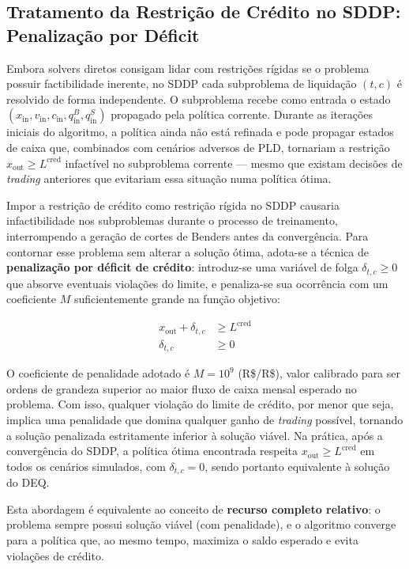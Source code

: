 \documentclass[12pt, a4paper]{article}
\begin{document}
\subsection{Tratamento da Restrição de Crédito no SDDP: Penalização por Déficit}
\label{sec:recurso_completo}

Embora solvers diretos consigam lidar com restrições rígidas se o problema possuir factibilidade inerente, no SDDP cada subproblema de liquidação $(t, c)$ é resolvido de forma independente. O subproblema recebe como entrada o estado $(x_{\text{in}}, v_{\text{in}}, c_{\text{in}}, q^B_{\text{in}}, q^S_{\text{in}})$ propagado pela política corrente. Durante as iterações iniciais do algoritmo, a política ainda não está refinada e pode propagar estados de caixa que, combinados com cenários adversos de PLD, tornariam a restrição $x_{\text{out}} \ge L^{\text{cred}}$ infactível no subproblema corrente — mesmo que existam decisões de \textit{trading} anteriores que evitariam essa situação numa política ótima.

Impor a restrição de crédito como restrição rígida no SDDP causaria infactibilidade nos subproblemas durante o processo de treinamento, interrompendo a geração de cortes de Benders antes da convergência. Para contornar esse problema sem alterar a solução ótima, adota-se a técnica de \textbf{penalização por déficit de crédito}: introduz-se uma variável de folga $\delta_{t,c} \ge 0$ que absorve eventuais violações do limite, e penaliza-se sua ocorrência com um coeficiente $M$ suficientemente grande na função objetivo:

\begin{align}
    x_{\text{out}} + \delta_{t,c} &\ge L^{\text{cred}} \label{eq:credito_soft} \\
    \delta_{t,c} &\ge 0
\end{align}

O coeficiente de penalidade adotado é $M = 10^9$ (R\$/R\$), valor calibrado para ser ordens de grandeza superior ao maior fluxo de caixa mensal esperado no problema. Com isso, qualquer violação do limite de crédito, por menor que seja, implica uma penalidade que domina qualquer ganho de \textit{trading} possível, tornando a solução penalizada estritamente inferior à solução viável. Na prática, após a convergência do SDDP, a política ótima encontrada respeita $x_{\text{out}} \ge L^{\text{cred}}$ em todos os cenários simulados, com $\delta_{t,c} = 0$, sendo portanto equivalente à solução do DEQ.

Esta abordagem é equivalente ao conceito de \textbf{recurso completo relativo}: o problema sempre possui solução viável (com penalidade), e o algoritmo converge para a política que, ao mesmo tempo, maximiza o saldo esperado e evita violações de crédito.
\end{document}
